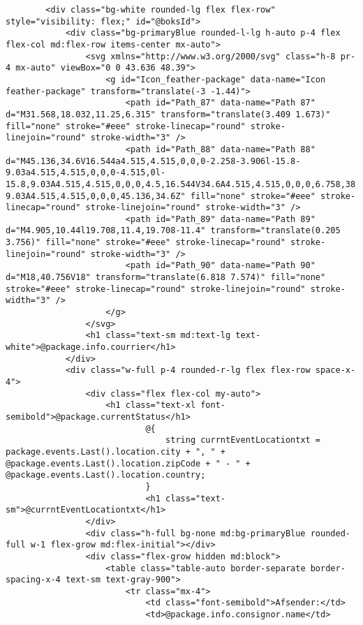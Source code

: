 \begin{verbatim}
        <div class="bg-white rounded-lg flex flex-row" style="visibility: flex;" id="@boksId">
            <div class="bg-primaryBlue rounded-l-lg h-auto p-4 flex flex-col md:flex-row items-center mx-auto">
                <svg xmlns="http://www.w3.org/2000/svg" class="h-8 pr-4 mx-auto" viewBox="0 0 43.636 48.39">
                    <g id="Icon_feather-package" data-name="Icon feather-package" transform="translate(-3 -1.44)">
                        <path id="Path_87" data-name="Path 87" d="M31.568,18.032,11.25,6.315" transform="translate(3.409 1.673)" fill="none" stroke="#eee" stroke-linecap="round" stroke-linejoin="round" stroke-width="3" />
                        <path id="Path_88" data-name="Path 88" d="M45.136,34.6V16.544a4.515,4.515,0,0,0-2.258-3.906l-15.8-9.03a4.515,4.515,0,0,0-4.515,0l-15.8,9.03A4.515,4.515,0,0,0,4.5,16.544V34.6A4.515,4.515,0,0,0,6.758,38.51l15.8,9.03a4.515,4.515,0,0,0,4.515,0l15.8-9.03A4.515,4.515,0,0,0,45.136,34.6Z" fill="none" stroke="#eee" stroke-linecap="round" stroke-linejoin="round" stroke-width="3" />
                        <path id="Path_89" data-name="Path 89" d="M4.905,10.44l19.708,11.4,19.708-11.4" transform="translate(0.205 3.756)" fill="none" stroke="#eee" stroke-linecap="round" stroke-linejoin="round" stroke-width="3" />
                        <path id="Path_90" data-name="Path 90" d="M18,40.756V18" transform="translate(6.818 7.574)" fill="none" stroke="#eee" stroke-linecap="round" stroke-linejoin="round" stroke-width="3" />
                    </g>
                </svg>
                <h1 class="text-sm md:text-lg text-white">@package.info.courrier</h1>
            </div>
            <div class="w-full p-4 rounded-r-lg flex flex-row space-x-4">
                <div class="flex flex-col my-auto">
                    <h1 class="text-xl font-semibold">@package.currentStatus</h1>
                            @{
                                string currntEventLocationtxt = package.events.Last().location.city + ", " + @package.events.Last().location.zipCode + " - " + @package.events.Last().location.country;
                            }
                            <h1 class="text-sm">@currntEventLocationtxt</h1>
                </div>
                <div class="h-full bg-none md:bg-primaryBlue rounded-full w-1 flex-grow md:flex-initial"></div>
                <div class="flex-grow hidden md:block">
                    <table class="table-auto border-separate border-spacing-x-4 text-sm text-gray-900">
                        <tr class="mx-4">
                            <td class="font-semibold">Afsender:</td>
                            <td>@package.info.consignor.name</td>

\end{verbatim}
